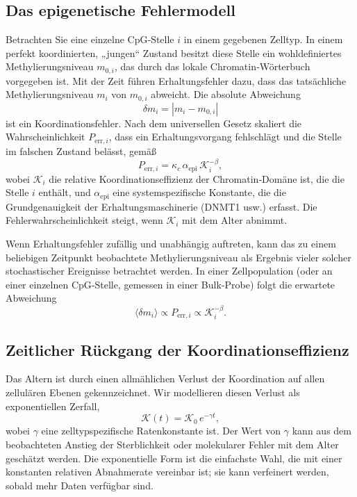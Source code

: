 \documentclass[12pt,a4paper]{article}
\newcommand{\REL}{\mathcal{K}}          %
\begin{document}
	\subsection{Das epigenetische Fehlermodell}
	Betrachten Sie eine einzelne CpG‑Stelle \(i\) in einem gegebenen Zelltyp. In einem perfekt koordinierten, „jungen“ Zustand besitzt diese Stelle ein wohldefiniertes Methylierungsniveau \(m_{0,i}\), das durch das lokale Chromatin‑Wörterbuch vorgegeben ist. Mit der Zeit führen Erhaltungsfehler dazu, dass das tatsächliche Methylierungsniveau \(m_i\) von \(m_{0,i}\) abweicht. Die absolute Abweichung
	\[
	\delta m_i = |m_i - m_{0,i}|
	\]
	ist ein Koordinationsfehler. Nach dem universellen Gesetz skaliert die Wahrscheinlichkeit \(P_{\mathrm{err},i}\), dass ein Erhaltungsvorgang fehlschlägt und die Stelle im falschen Zustand belässt, gemäß
	\begin{equation}
		P_{\mathrm{err},i} = \kappa_c \, \alpha_{\mathrm{epi}} \, \REL_i^{-\beta},
		\label{eq:perr}
	\end{equation}
	wobei \(\REL_i\) die relative Koordinationseffizienz der Chromatin‑Domäne ist, die die Stelle \(i\) enthält, und \(\alpha_{\mathrm{epi}}\) eine systemspezifische Konstante, die die Grundgenauigkeit der Erhaltungsmaschinerie (DNMT1 usw.) erfasst. Die Fehlerwahrscheinlichkeit steigt, wenn \(\REL_i\) mit dem Alter abnimmt.
	
	Wenn Erhaltungsfehler zufällig und unabhängig auftreten, kann das zu einem beliebigen Zeitpunkt beobachtete Methylierungsniveau als Ergebnis vieler solcher stochastischer Ereignisse betrachtet werden. In einer Zellpopulation (oder an einer einzelnen CpG‑Stelle, gemessen in einer Bulk‑Probe) folgt die erwartete Abweichung
	\[
	\langle \delta m_i \rangle \propto P_{\mathrm{err},i} \propto \REL_i^{-\beta}.
	\]
	
	\subsection{Zeitlicher Rückgang der Koordinationseffizienz}
	Das Altern ist durch einen allmählichen Verlust der Koordination auf allen zellulären Ebenen gekennzeichnet. Wir modellieren diesen Verlust als exponentiellen Zerfall,
	\begin{equation}
		\REL(t) = \REL_0 \, e^{-\gamma t},
		\label{eq:Kdecay}
	\end{equation}
	wobei \(\gamma\) eine zelltypspezifische Ratenkonstante ist. Der Wert von \(\gamma\) kann aus dem beobachteten Anstieg der Sterblichkeit oder molekularer Fehler mit dem Alter geschätzt werden. Die exponentielle Form ist die einfachste Wahl, die mit einer konstanten relativen Abnahmerate vereinbar ist; sie kann verfeinert werden, sobald mehr Daten verfügbar sind.
	
\end{document}
